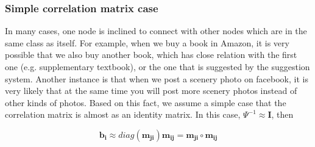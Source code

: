 \subsubsection{Simple correlation matrix case}

In many cases, one node is inclined to connect with other nodes which are in the same class as itself. For example, when we buy a book in Amazon, it is very possible that we also buy another book, which has close relation with the first one (e.g. supplementary textbook), or the one that is suggested by the suggestion system. Another instance is that when we post a scenery photo on facebook, it is very likely that at the same time you will post more scenery photos instead of other kinds of photos. Based on this fact, we assume a simple case that the correlation matrix is almost as an identity matrix. In this case, $\Psi^{-1} \approx \mathbf{I}$, then

\begin{equation}
\label{equ:simplecorrelation}
\mathbf{b_i} \approx diag(\mathbf{m_{ji}})\mathbf{m_{ij}} = \mathbf{m_{ji}}\circ \mathbf{m_{ij}}
\end{equation}

